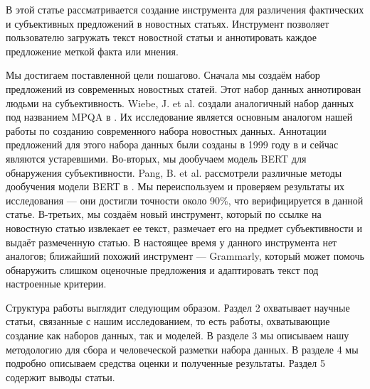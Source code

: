 \documentclass[conference]{IEEEtran}
\begin{document}
В этой статье рассматривается создание инструмента для различения фактических и субъективных предложений в новостных статьях. Инструмент позволяет пользователю загружать текст новостной статьи и аннотировать каждое предложение меткой факта или мнения.

Мы достигаем поставленной цели пошагово. Сначала мы создаём набор предложений из современных новостных статей. Этот набор данных аннотирован людьми на субъективность. Wiebe, J. et al. создали аналогичный набор данных под названием MPQA в \cite{mpqa}. Их исследование является основным аналогом нашей работы по созданию современного набора новостных данных. Аннотации предложений для этого набора данных были созданы в 1999 году в \cite{mpqa-opinion} и сейчас являются устаревшими. Во-вторых, мы дообучаем модель BERT для обнаружения субъективности. Pang, B. et al. рассмотрели различные методы дообучения модели BERT в \cite{bert-finetune}. Мы переиспользуем и проверяем результаты их исследования --- они достигли точности около 90\%, что верифицируется в данной статье. В-третьих, мы создаём новый инструмент, который по ссылке на новостную статью извлекает ее текст, размечает его на предмет субъективности и выдаёт размеченную статью. В настоящее время у данного инструмента нет аналогов; ближайший похожий инструмент — Grammarly, который может помочь обнаружить слишком оценочные предложения и адаптировать текст под настроенные критерии.

Структура работы выглядит следующим образом. Раздел 2 охватывает научные статьи, связанные с нашим исследованием, то есть работы, охватывающие создание как наборов данных, так и моделей. В разделе 3 мы описываем нашу методологию для сбора и человеческой разметки набора данных. В разделе 4 мы подробно описываем средства оценки и полученные результаты. Раздел 5 содержит выводы статьи.
\end{document}
